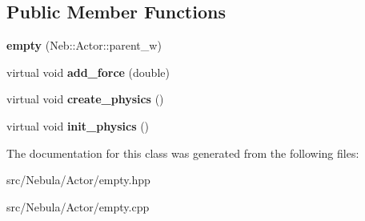\subsection*{\-Public \-Member \-Functions}
\begin{DoxyCompactItemize}
\item 
\hypertarget{classNeb_1_1Actor_1_1empty_abb722f20d6fdb41dca959e1a7ec1f7ce}{{\bfseries empty} (\-Neb\-::\-Actor\-::parent\-\_\-w)}\label{classNeb_1_1Actor_1_1empty_abb722f20d6fdb41dca959e1a7ec1f7ce}

\item 
\hypertarget{classNeb_1_1Actor_1_1empty_ae38621f3ae057ad375ca92af3711a98c}{virtual void {\bfseries add\-\_\-force} (double)}\label{classNeb_1_1Actor_1_1empty_ae38621f3ae057ad375ca92af3711a98c}

\item 
\hypertarget{classNeb_1_1Actor_1_1empty_a76ce00f25471d85dd2469a458491ecfd}{virtual void {\bfseries create\-\_\-physics} ()}\label{classNeb_1_1Actor_1_1empty_a76ce00f25471d85dd2469a458491ecfd}

\item 
\hypertarget{classNeb_1_1Actor_1_1empty_a55c552dcd2d7876b36cf54583ea4be3d}{virtual void {\bfseries init\-\_\-physics} ()}\label{classNeb_1_1Actor_1_1empty_a55c552dcd2d7876b36cf54583ea4be3d}

\end{DoxyCompactItemize}


\-The documentation for this class was generated from the following files\-:\begin{DoxyCompactItemize}
\item 
src/\-Nebula/\-Actor/empty.\-hpp\item 
src/\-Nebula/\-Actor/empty.\-cpp\end{DoxyCompactItemize}

